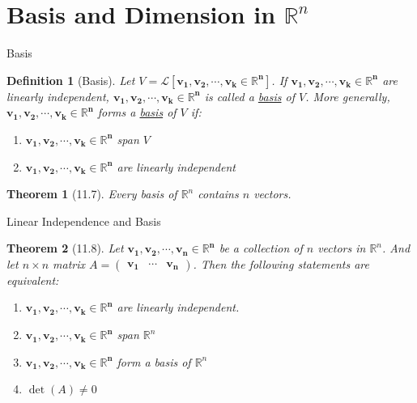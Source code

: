 \documentclass[a4paper,11pt]{article}
\newtheorem{defn}{Definition}
\newtheorem{thm}{Theorem}
\begin{document}

\section{Basis and Dimension in $\mathbb{R}^n$} %
\label{sec:basis_and_dimension_in_mathbb_r_n}
\begin{frame}[t]{Basis}
	\begin{defn}
		[Basis] Let $V=\mathcal{L}[\mathbf{v_1,v_2,\cdots,v_k\in\mathbb{R}^n}]$. If $\mathbf{v_1,v_2,\cdots,v_k\in\mathbb{R}^n}$ are linearly independent, $\mathbf{v_1,v_2,\cdots,v_k\in\mathbb{R}^n}$ is called a \uline{basis} of $V$. More generally,  $\mathbf{v_1,v_2,\cdots,v_k\in\mathbb{R}^n}$ forms a \uline{basis} of $V$ if:
		\begin{enumerate}
			\item $\mathbf{v_1,v_2,\cdots,v_k\in\mathbb{R}^n}$ span $V$
			\item $\mathbf{v_1,v_2,\cdots,v_k\in\mathbb{R}^n}$ are linearly independent
		\end{enumerate}
	\end{defn}
	\begin{thm}
		[11.7] Every basis of $\mathbb{R}^n$ contains $n$ vectors.
	\end{thm}
\end{frame}

\begin{frame}[t]{Linear Independence and Basis}
	\begin{thm}
		[11.8] Let $\mathbf{v_1,v_2,\cdots,v_n\in\mathbb{R}^n}$ be a collection of $n$ vectors in $\mathbb{R}^n$. And let $n\times n$ matrix $A = \begin{pmatrix}
			\mathbf{v_1}&\cdots&\mathbf{v_n}
		\end{pmatrix}$. Then the following statements are equivalent:
		\begin{enumerate}
			\item $\mathbf{v_1,v_2,\cdots,v_k\in\mathbb{R}^n}$ are linearly independent.
			\item $\mathbf{v_1,v_2,\cdots,v_k\in\mathbb{R}^n}$ span $\mathbb{R}^n$
			\item $\mathbf{v_1,v_2,\cdots,v_k\in\mathbb{R}^n}$ form a basis of $\mathbb{R}^n$
			\item $\det(A)\neq 0$
		\end{enumerate}
	\end{thm}
\end{frame}
\end{document}
